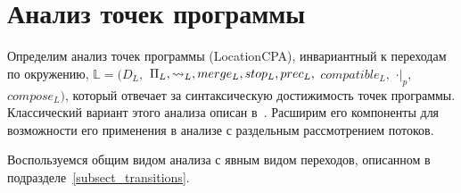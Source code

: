 \section{Анализ точек программы}
\label{sect_location_analysis}

Определим анализ точек программы (LocationCPA), инвариантный к переходам по окружению,
$\mathbb{L}=(D_{L},$ $\Pi_{L}, \leadsto_{L}, merge_{L}, stop_{L}, prec_{L},$ $compatible_{L},$ $\cdot|_p,$ $compose_L)$, который отвечает за синтаксическую достижимость точек программы.
Классический вариант этого анализа описан в~\cite{Beyer08}.
Расширим его компоненты для возможности его применения в анализе с раздельным рассмотрением потоков.

Воспользуемся общим видом анализа с явным видом переходов, описанном в подразделе~\ref{subsect_transitions}.
 
